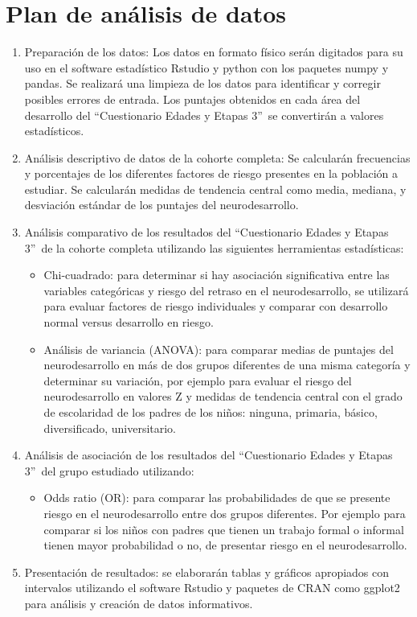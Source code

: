 \documentclass[11pt,letterpaper]{report}
\newcommand{\asq}{“Cuestionario Edades y Etapas 3”}
\begin{document}
\section{Plan de análisis de datos}
\begin{enumerate}
	\item Preparación de los datos: Los datos en formato físico serán
	digitados para su uso en el software estadístico Rstudio y python con los
	paquetes numpy y pandas. Se realizará una limpieza de los datos para
	identificar y corregir posibles errores de entrada. Los puntajes obtenidos
	en cada área del desarrollo del \asq\ se convertirán a valores
	estadísticos. 
	
	\item Análisis descriptivo de datos de la cohorte completa: Se calcularán
	frecuencias y porcentajes de los diferentes factores de riesgo presentes en
	la población a estudiar. Se calcularán medidas de tendencia central como
	media, mediana, y desviación estándar de los puntajes del neurodesarrollo.

	\item Análisis comparativo de los resultados del \asq\ de la cohorte
	completa utilizando las siguientes herramientas estadísticas:
		\begin{itemize}
		\item Chi-cuadrado: para determinar si hay asociación significativa
		entre las variables categóricas y riesgo del retraso en el
		neurodesarrollo, se utilizará para evaluar factores de riesgo
		individuales y comparar con desarrollo normal versus desarrollo en
		riesgo.
		\item Análisis de variancia (ANOVA): para comparar medias de puntajes
		del neurodesarrollo en más de dos grupos diferentes de una misma
		categoría y determinar su variación, por ejemplo para evaluar el riesgo
		del neurodesarrollo en valores Z y medidas de tendencia central con
		el grado de escolaridad de los padres de los niños: ninguna, primaria,
		básico, diversificado, universitario.
		\end{itemize}

	\item Análisis de asociación de los resultados del \asq\ del grupo
	estudiado utilizando:
		\begin{itemize}
		\item Odds ratio (OR): para comparar las probabilidades de que se
		presente riesgo en el neurodesarrollo entre dos grupos diferentes.
		Por ejemplo para comparar si los niños con padres que tienen un trabajo
		formal o informal tienen mayor probabilidad o no, de presentar riesgo
		en el neurodesarrollo.
		\end{itemize}
	\item Presentación de resultados: se elaborarán tablas y gráficos
	apropiados con intervalos utilizando el software Rstudio y paquetes de
	CRAN como ggplot2 para análisis y creación de datos informativos.
\end{enumerate}
\end{document}
